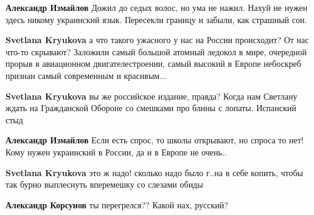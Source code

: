 \begin{itemize}
\begin{itemize}
\textbf{Александр Измайлов} Дожил до седых волос, но ума не нажил. Нахуй не нужен здесь никому украинский язык. Пересекли границу и забыли, как страшный сон.

 
\textbf{Svetlana Kryukova} а что такого ужасного у нас на России происходит? От нас что-то скрывают?
Заложили самый большой атомный ледокол в мире, очередной прорыв в авиационном двигателестроении, самый высокий в Европе небоскреб признан самый современным и красивым...

 
\textbf{Svetlana Kryukova} вы же российское издание, правда? Когда нам Светлану ждать на Гражданской Обороне со смешками про блины с лопаты. Испанский стыд

 
\textbf{Александр Измайлов} Если есть спрос, то школы открывают, но спроса то нет! Кому нужен украинский в России, да и в Европе не очень..

 
\textbf{Svetlana Kryukova} это ж надо! сколько надо было г..на в себе копить, чтобы так бурно выплеснуть вперемешку со слезами обиды

 
\textbf{Александр Корсунов} ты перегрелся?? Какой нах, русский?

 

\end{itemize}
\end{itemize}
